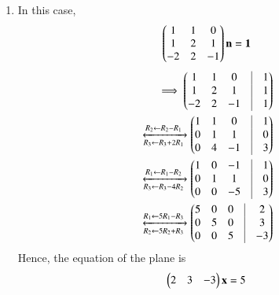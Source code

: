 \begin{enumerate}
\begin{figure}[h!]
    \caption{}
     \label{fig:chapters/12/11/3/6/1}
     \end{figure}
     \item  In this case, 
\begin{align}
\begin{pmatrix}1&1&0 \\ 1&2&1 \\ -2&2&-1\end{pmatrix} \mathbf{n}=\mathbf{1}
\end{align}
\begin{align*}
\implies
\myvec{1&1&0&\vrule&1\\1&2&1&\vrule&1\\-2&2&-1&\vrule&1}
\\
\xleftrightarrow[R_3 \leftarrow R_3 + 2R_1]{R_2 \leftarrow R_2 - R_1}
\myvec{1&1&0&\vrule&1\\0&1&1&\vrule&0\\0&4&-1&\vrule&3}
\\
	\xleftrightarrow[R_3 \leftarrow R_3 - 4R_2]{R_1 \leftarrow R_1- R_2}
\myvec{1&0&-1&\vrule&1\\0&1&1&\vrule&0\\0&0&-5&\vrule&3}\\
	\xleftrightarrow[R_2 \leftarrow 5R_2 + R_3]{R_1 \leftarrow 5R_1- R_3}
\myvec{5&0&0&\vrule&2\\0&5&0&\vrule&3\\0&0&5&\vrule&-3}
\end{align*}
Hence, the equation of the plane is
\begin{align}
\begin{pmatrix}2 & 3 & -3\end{pmatrix} \mathbf{x} = 5
\end{align}
\end{enumerate}
